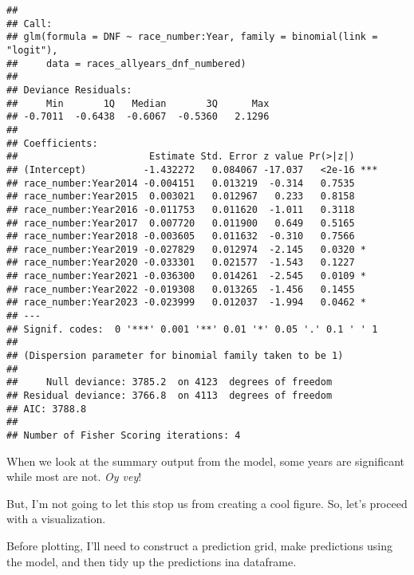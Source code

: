 \documentclass[
]{book}
\begin{document}
\begin{verbatim}
## 
## Call:
## glm(formula = DNF ~ race_number:Year, family = binomial(link = "logit"), 
##     data = races_allyears_dnf_numbered)
## 
## Deviance Residuals: 
##     Min       1Q   Median       3Q      Max  
## -0.7011  -0.6438  -0.6067  -0.5360   2.1296  
## 
## Coefficients:
##                       Estimate Std. Error z value Pr(>|z|)    
## (Intercept)          -1.432272   0.084067 -17.037   <2e-16 ***
## race_number:Year2014 -0.004151   0.013219  -0.314   0.7535    
## race_number:Year2015  0.003021   0.012967   0.233   0.8158    
## race_number:Year2016 -0.011753   0.011620  -1.011   0.3118    
## race_number:Year2017  0.007720   0.011900   0.649   0.5165    
## race_number:Year2018 -0.003605   0.011632  -0.310   0.7566    
## race_number:Year2019 -0.027829   0.012974  -2.145   0.0320 *  
## race_number:Year2020 -0.033301   0.021577  -1.543   0.1227    
## race_number:Year2021 -0.036300   0.014261  -2.545   0.0109 *  
## race_number:Year2022 -0.019308   0.013265  -1.456   0.1455    
## race_number:Year2023 -0.023999   0.012037  -1.994   0.0462 *  
## ---
## Signif. codes:  0 '***' 0.001 '**' 0.01 '*' 0.05 '.' 0.1 ' ' 1
## 
## (Dispersion parameter for binomial family taken to be 1)
## 
##     Null deviance: 3785.2  on 4123  degrees of freedom
## Residual deviance: 3766.8  on 4113  degrees of freedom
## AIC: 3788.8
## 
## Number of Fisher Scoring iterations: 4
\end{verbatim}

When we look at the summary output from the model, some years are significant while most are not. \emph{Oy vey}!

But, I'm not going to let this stop us from creating a cool figure. So, let's proceed with a visualization.

Before plotting, I'll need to construct a prediction grid, make predictions using the model, and then tidy up the predictions ina dataframe.
\end{document}
